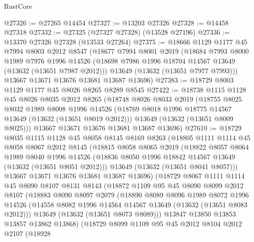 \begin{lexlean}{RustCore}
\begin{coremodule}
@27326 := @27265 @14454
@27327 := @13203 @27326
@27328 := @14458 @27318
@27332 := @27325 (@27327 @27328) (@13528 @27196)
@27336 := @13370 @27326 @27328 (@13533 @27264)
@27375 := @18666
    @1129
    @1177
    @45
    @7994
    @8003
    @2012
    @8547
    (@18677
      @7994
      @8001
      @2019
      (@18684
        @7993
        @8000
        @1989
        @7976
        @1996
        @14526
        (@18698 @7986 @1996 @18704 @14567 @13649 (@13632 (@13651 @7987 @2012)))
        @13649
        (@13632 (@13651 @7977 @7993)))
      @13667
      @13671
      @13676
      @13681
      @13687
      @13696)
@27383 := @18729 @8003 @1129 @1177 @45 @8026 @8265 @8289 @8545
@27422 := @18738
    @1115
    @1128
    @45
    @8026
    @8035
    @2012
    @8265
    (@18748
      @8026
      @8033
      @2019
      (@18755
        @8025
        @8032
        @1989
        @8008
        @1996
        @14526
        (@18769 @8018 @1996 @18775 @14567 @13649 (@13632 (@13651 @8019 @2012)))
        @13649
        (@13632 (@13651 @8009 @8025)))
      @13667
      @13671
      @13676
      @13681
      @13687
      @13696)
@27610 := @18729
    @8035
    @1115
    @1128
    @45
    @8058
    @8145
    @8169
    @8263
    (@18805
      @1111
      @1114
      @45
      @8058
      @8067
      @2012
      @8145
      (@18815
        @8058
        @8065
        @2019
        (@18822
          @8057
          @8064
          @1989
          @8040
          @1996
          @14526
          (@18836 @8050 @1996 @18842 @14567 @13649 (@13632 (@13651 @8051 @2012)))
          @13649
          (@13632 (@13651 @8041 @8057)))
        @13667
        @13671
        @13676
        @13681
        @13687
        @13696)
      (@18729
        @8067
        @1111
        @1114
        @45
        @8090
        @8107
        @8131
        @8143
        (@18872
          @1109
          @95
          @45
          @8090
          @8099
          @2012
          @8107
          (@18883
            @8090
            @8097
            @2079
            (@18890
              @8089
              @8096
              @1989
              @8072
              @1996
              @14526
              (@14558 @8082 @1996 @14564 @14567 @13649 (@13632 (@13651 @8083 @2012)))
              @13649
              (@13632 (@13651 @8073 @8089)))
            @13847
            @13850
            @13853
            @13857
            @13862
            @13868)
          (@18729
            @8099
            @1109
            @95
            @45
            @2012
            @8104
            @2012
            @2107
            (@18928

\end{coremodule}
\end{lexlean}
